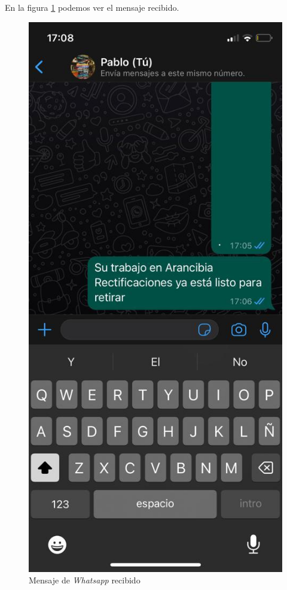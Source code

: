En la figura \ref{fig:ensayomensajecel2} podemos ver el mensaje recibido.

\begin{figure}[H]
	\centering
	\includegraphics[scale=.20]{./Figures/ensayo-1/15.qr-api-1.jpeg}
	\caption{Mensaje de \textit{Whatsapp} recibido}
	\label{fig:ensayomensajecel2}
\end{figure}

